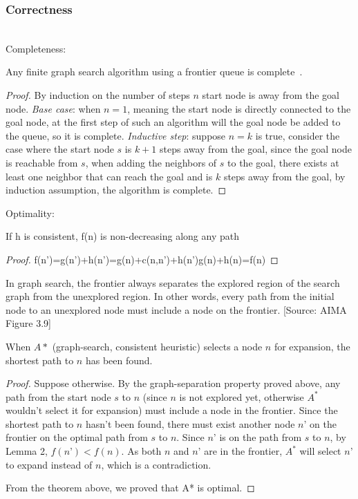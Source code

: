 \documentclass{llncs}
\begin{document}
\subsubsection{Correctness}\hfill\\
Completeness: 
\begin{lemma} 
Any finite graph search algorithm using a frontier queue is complete~\cite{ref_url1}.
\end{lemma} 
\begin{proof} 
By induction on the number of steps $n$ start node is away from the goal node. \emph{Base case}: when $n=1$, meaning the start node is directly connected to the goal node, at the first step of such an algorithm will the goal node be added to the queue, so it is complete. \emph{Inductive step}: suppose $n=k$ is true, consider the case where the start node $s$ is $k+1$ steps away from the goal, since the goal node is reachable from $s$, when adding the neighbors of $s$ to the goal, there exists at least one neighbor that can reach the goal and is $k$ steps away from the goal, by induction assumption, the algorithm is complete. 
\end{proof}
Optimality: 
\begin{lemma} 
If h is consistent, f(n) is non-decreasing along any path 
\end{lemma}
\begin{proof}
f(n')=g(n')+h(n')=g(n)+c(n,n')+h(n')g(n)+h(n)=f(n) 
\end{proof}
\begin{lemma}  In graph search, the frontier always separates the explored region of the search graph from the unexplored region. In other words, every path from the initial node to an unexplored node must include a node on the frontier.  [Source: AIMA Figure 3.9] \end{lemma}
\begin{theorem} 
When $A*$ (graph-search, consistent heuristic) selects a node $n$ for expansion, the shortest path to $n$ has been found. 
\end{theorem}
\begin{proof}
Suppose otherwise. By the graph-separation property proved above, any path from the start node $s$ to $n$ (since $n$ is not explored yet, otherwise $A^*$ wouldn’t select it for expansion) must include a node in the frontier. Since the shortest path to $n$ hasn’t been found, there must exist another node $n’$ on the frontier on the optimal path from $s$ to $n$. Since $n’$ is on the path from $s$ to $n$, by Lemma 2, $f(n’)<f(n)$. As both $n$ and $n’$ are in the frontier, $A^*$ will select $n’$ to expand instead of $n$, which is a contradiction.

From the theorem above, we proved that A* is optimal.
\end{proof}
\end{document}
